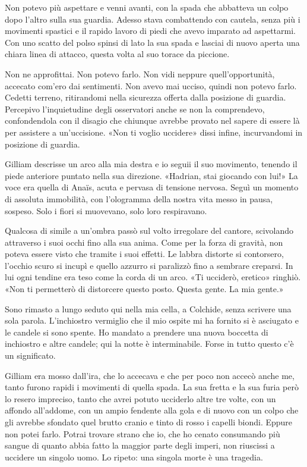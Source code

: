 Non potevo più aspettare e venni avanti, con la spada che abbatteva un
colpo dopo l'altro sulla sua guardia. Adesso stava {combattendo} con
cautela, senza più i movimenti spastici e il rapido lavoro di piedi che
avevo imparato ad aspettarmi. Con uno scatto del polso spinsi di lato la
sua spada e lasciai di nuovo aperta una chiara linea di attacco, questa
volta al suo torace da piccione.

Non ne approfittai. Non potevo farlo. Non vidi neppure
quell'opportunità, accecato com'ero dai sentimenti. Non avevo mai
ucciso, quindi non potevo farlo. Cedetti terreno, ritirandomi nella
sicurezza offerta dalla posizione di guardia. Percepivo l'inquietudine
degli osservatori anche se non la comprendevo, confondendola con il
disagio che chiunque avrebbe provato nel sapere di essere là per
assistere a un'uccisione. «Non ti voglio uccidere» dissi infine,
incurvandomi in posizione di guardia.

Gilliam descrisse un arco alla mia destra e io seguii il suo movimento,
tenendo il piede anteriore puntato nella sua direzione. «Hadrian, stai
giocando con lui!» La voce era quella di Anaïs, acuta e pervasa di
tensione nervosa. Seguì un momento di assoluta immobilità, con
l'ologramma della nostra vita messo in pausa, sospeso. Solo i fiori si
muovevano, solo loro respiravano.

Qualcosa di simile a un'ombra passò sul volto irregolare del cantore,
scivolando attraverso i suoi occhi fino alla sua anima. Come per la
forza di gravità, non poteva essere visto che tramite i suoi effetti. Le
labbra distorte si contorsero, l'occhio scuro si incupì e quello azzurro
si paralizzò fino a sembrare creparsi. In lui ogni tendine era teso come
la corda di un arco. «Ti ucciderò, eretico» ringhiò. «Non ti permetterò
di distorcere questo posto. Questa gente. La mia gente.»

Sono rimasto a lungo seduto qui nella mia cella, a Colchide, senza
scrivere una sola parola. L'inchiostro vermiglio che il mio ospite mi ha
fornito si è asciugato e le candele si sono spente. Ho mandato a
prendere una nuova boccetta di inchiostro e altre candele; qui la notte
è interminabile. Forse in tutto questo c'è un significato.

Gilliam era mosso dall'ira, che lo accecava e che per poco non accecò
anche me, tanto furono rapidi i movimenti di quella spada. La sua fretta
e la sua furia però lo resero impreciso, tanto che avrei potuto
ucciderlo altre tre volte, con un affondo all'addome, con un ampio
fendente alla gola e di nuovo con un colpo che gli avrebbe sfondato quel
brutto cranio e tinto di rosso i capelli biondi. Eppure non potei farlo.
Potrai trovare strano che io, che ho cenato consumando più sangue di
quanto abbia fatto la maggior parte degli imperi, non riuscissi a
uccidere un singolo uomo. Lo ripeto: una singola morte è una tragedia.

